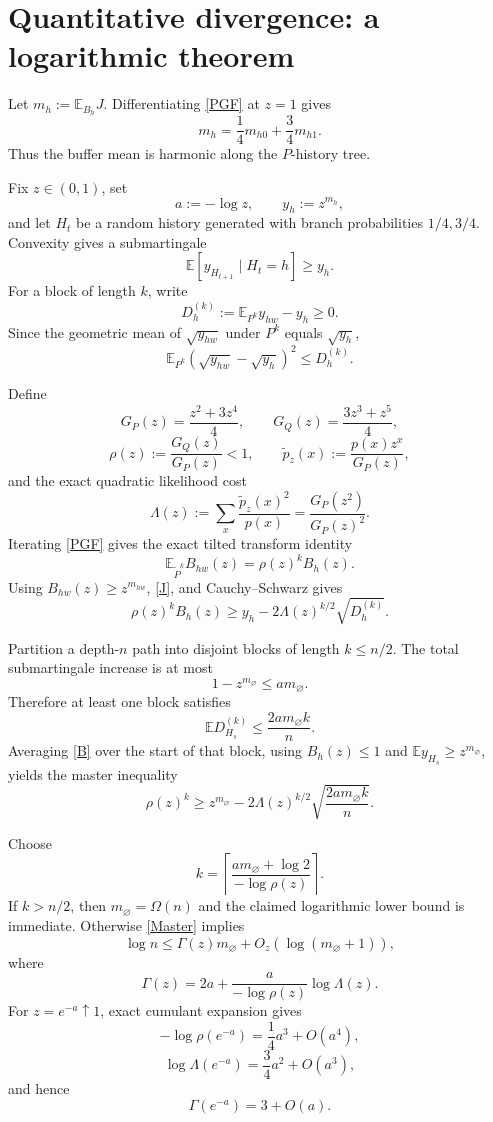 \documentclass[11pt,a4paper]{article}
\newcommand{\E}{\mathbb E}
\newcommand{\1}{\mathbf 1}
\begin{document}
\section{Quantitative divergence: a logarithmic theorem}

Let \(m_h:=\E_{B_h}J\).  Differentiating \eqref{PGF} at \(z=1\) gives
\[
\boxed{
 m_h=\frac14m_{h0}+\frac34m_{h1}.
}
\tag{M}
\]
Thus the buffer mean is harmonic along the \(P\)-history tree.

Fix \(z\in(0,1)\), set
\[
a:=-\log z,
\qquad
y_h:=z^{m_h},
\]
and let \(H_t\) be a random history generated with branch probabilities
\(1/4,3/4\).  Convexity gives a submartingale
\[
\E[y_{H_{t+1}}\mid H_t=h]\ge y_h.
\]
For a block of length \(k\), write
\[
D_h^{(k)}
:=
\E_{P^k}y_{hw}-y_h
\ge0.
\]
Since the geometric mean of \(\sqrt{y_{hw}}\) under \(P^k\) equals
\(\sqrt{y_h}\),
\[
\boxed{
\E_{P^k}
\left(\sqrt{y_{hw}}-\sqrt{y_h}\right)^2
\le D_h^{(k)}.
}
\tag{J}
\]

Define
\[
G_P(z)=\frac{z^2+3z^4}{4},
\qquad
G_Q(z)=\frac{3z^3+z^5}{4},
\]
\[
\rho(z):=\frac{G_Q(z)}{G_P(z)}<1,
\qquad
\widetilde p_z(x):=\frac{p(x)z^x}{G_P(z)},
\]
and the exact quadratic likelihood cost
\[
\Lambda(z)
:=
\sum_x\frac{\widetilde p_z(x)^2}{p(x)}
=
\frac{G_P(z^2)}{G_P(z)^2}.
\]
Iterating \eqref{PGF} gives the exact tilted transform identity
\[
\boxed{
\E_{\widetilde P^k}B_{hw}(z)
=
\rho(z)^kB_h(z).
}
\tag{T}
\]
Using \(B_{hw}(z)\ge z^{m_{hw}}\), \eqref{J}, and Cauchy--Schwarz gives
\[
\rho(z)^kB_h(z)
\ge
 y_h-2\Lambda(z)^{k/2}\sqrt{D_h^{(k)}}.
\tag{B}
\]

Partition a depth-\(n\) path into disjoint blocks of length \(k\le n/2\).
The total submartingale increase is at most
\[
1-z^{m_\varnothing}
\le am_\varnothing.
\]
Therefore at least one block satisfies
\[
\E D_{H_s}^{(k)}
\le
\frac{2am_\varnothing k}{n}.
\]
Averaging \eqref{B} over the start of that block, using
\(B_h(z)\le1\) and \(\E y_{H_s}\ge z^{m_\varnothing}\), yields the master inequality
\[
\boxed{
\rho(z)^k
\ge
z^{m_\varnothing}
-
2\Lambda(z)^{k/2}
\sqrt{\frac{2am_\varnothing k}{n}}.
}
\tag{Master}
\]

Choose
\[
k=
\left\lceil
\frac{am_\varnothing+\log2}{-\log\rho(z)}
\right\rceil.
\]
If \(k>n/2\), then \(m_\varnothing=\Omega(n)\) and the claimed logarithmic
lower bound is immediate.  Otherwise \eqref{Master} implies
\[
\log n
\le
\Gamma(z)m_\varnothing+O_z(\log(m_\varnothing+1)),
\]
where
\[
\boxed{
\Gamma(z)
=
2a
+
\frac{a}{-\log\rho(z)}\log\Lambda(z).
}
\]
For \(z=e^{-a}\uparrow1\), exact cumulant expansion gives
\[
-\log\rho(e^{-a})
=
\frac14a^3+O(a^4),
\]
\[
\log\Lambda(e^{-a})
=
\frac34a^2+O(a^3),
\]
and hence
\[
\Gamma(e^{-a})=3+O(a).
\]
\end{document}
